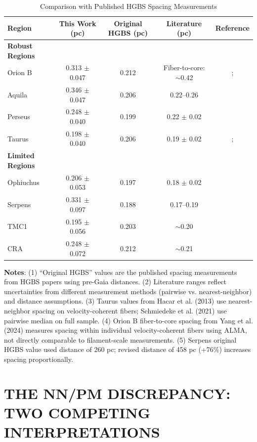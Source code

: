 \documentclass[twoside,twocolumn]{mnras}
\begin{document}
\begin{table}
\caption{Comparison with Published HGBS Spacing Measurements}
\label{tab:literature}
\begin{tabular}{lcccc}
\toprule
Region & This Work (pc) & Original HGBS (pc) & Literature (pc) & Reference \\
\midrule
\textbf{Robust Regions} &  &  &  &  \\
Orion B & 0.313 $\pm$ 0.047 & 0.212 & Fiber-to-core: $\sim$0.42 & \citet{Konyves2020}; \citet{Yang2024} \\
Aquila  & 0.346 $\pm$ 0.047 & 0.206 & 0.22--0.26 & \citet{Konyves2015} \\
Perseus & 0.248 $\pm$ 0.040 & 0.199 & 0.22 $\pm$ 0.02 & \citet{Andre2016} \\
Taurus  & 0.198 $\pm$ 0.040 & 0.206 & 0.19 $\pm$ 0.02 & \citet{Hacar2013}; \citet{Schmiedeke2021} \\
\midrule
\textbf{Limited Regions} &  &  &  &  \\
Ophiuchus & 0.206 $\pm$ 0.053 & 0.197 & 0.18 $\pm$ 0.02 & \citet{Konyves2020} \\
Serpens  & 0.331 $\pm$ 0.097 & 0.188 & 0.17--0.19 & \citet{Konyves2020} \\
TMC1     & 0.195 $\pm$ 0.056 & 0.203 & $\sim$0.20 & \citet{Hacar2013} \\
CRA      & 0.248 $\pm$ 0.072 & 0.212 & $\sim$0.21 & \citet{Konyves2020} \\
\bottomrule
\end{tabular}

\vspace{0.1in}
\footnotesize
\textbf{Notes}: (1) ``Original HGBS'' values are the published spacing measurements from HGBS papers using pre-Gaia distances. (2) Literature ranges reflect uncertainties from different measurement methods (pairwise vs. nearest-neighbor) and distance assumptions. (3) Taurus values from Hacar et al. (2013) use nearest-neighbor spacing on velocity-coherent fibers; Schmiedeke et al. (2021) use pairwise median on full sample. (4) Orion B fiber-to-core spacing from Yang et al. (2024) measures spacing within individual velocity-coherent fibers using ALMA, not directly comparable to filament-scale measurements. (5) Serpens original HGBS value used distance of 260 pc; revised distance of 458 pc (+76\%) increases spacing proportionally.
\end{table}

\section{THE NN/PM DISCREPANCY: TWO COMPETING INTERPRETATIONS}
\label{sec:nndiscrepancy}
\end{document}
